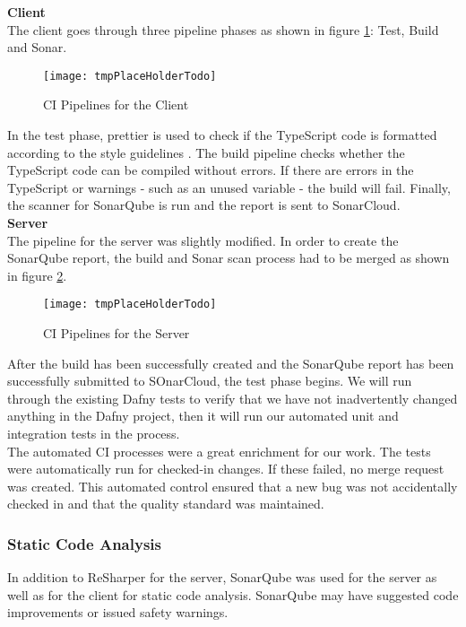 {\bf Client}\\
The client goes through three pipeline phases as shown in figure \ref{fig:ci_client}: Test, Build and Sonar.

\begin{figure}[H]
    \centering
    \texttt{[image: tmpPlaceHolderTodo]}
    \caption{CI Pipelines for the Client}
    \label{fig:ci_client}
\end{figure}

In the test phase, prettier \cite{dev} is used to check if the TypeScript code
is formatted according to the style guidelines \cite{projectplan}.
The build pipeline checks whether the TypeScript code can be compiled without errors.
If there are errors in the TypeScript or warnings - such as an unused variable - the build will fail.
Finally, the scanner for SonarQube is run and the report is sent to SonarCloud. \\

{\bf Server}\\
The pipeline for the server was slightly modified.
In order to create the SonarQube report, the build and Sonar scan process had to be merged
as shown in figure \ref{fig:ci_server}.

\begin{figure}[H]
    \centering
    \texttt{[image: tmpPlaceHolderTodo]}
    \caption{CI Pipelines for the Server}
    \label{fig:ci_server}
\end{figure}

After the build has been successfully created
and the SonarQube report has been successfully submitted to SOnarCloud,
the test phase begins.
We will run through the existing Dafny tests to verify
that we have not inadvertently changed anything in the Dafny project,
then it will run our automated unit and integration tests in the  process. \\

The automated CI processes were a great enrichment for our work.
The tests were automatically run for checked-in changes.
If these failed, no merge request was created.
This automated control ensured that a new bug was not accidentally checked in
and that the quality standard was maintained.

\subsubsection{Static Code Analysis}
In addition to ReSharper for the server, SonarQube was used for the server as well as for the client for static code analysis.
SonarQube may have suggested code improvements or issued safety warnings. \\

